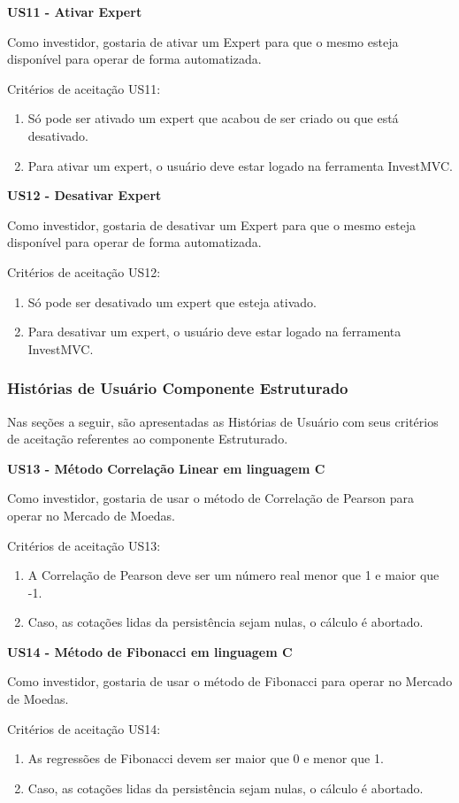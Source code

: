 \textbf{US11 - Ativar Expert}

Como investidor, gostaria de ativar um Expert para que o mesmo esteja disponível para operar de forma automatizada.

Critérios de aceitação US11:
\begin{enumerate}
\item Só pode ser ativado um expert que acabou de ser criado ou que está desativado.
\item Para ativar um expert, o usuário deve estar logado na ferramenta InvestMVC.
\end{enumerate}

\textbf{US12 - Desativar Expert}

Como investidor, gostaria de desativar um Expert para que o mesmo esteja disponível para operar de forma automatizada.

Critérios de aceitação US12:
\begin{enumerate}
\item Só pode ser desativado um expert que esteja ativado.
\item Para desativar um expert, o usuário deve estar logado na ferramenta InvestMVC.
\end{enumerate}

\subsubsection{Histórias de Usuário Componente Estruturado}
Nas seções a seguir, são apresentadas as Histórias de Usuário com seus critérios de aceitação referentes ao componente Estruturado.

\textbf{US13 - Método Correlação Linear em linguagem C}

Como investidor, gostaria de usar o método de Correlação de Pearson para operar no Mercado de Moedas.

Critérios de aceitação US13:
\begin{enumerate}
\item A Correlação de Pearson deve ser um número real menor que 1 e maior que -1.
\item Caso, as cotações lidas da persistência sejam nulas, o cálculo é abortado.
\end{enumerate}

\textbf{US14 - Método de Fibonacci em linguagem C}

Como investidor, gostaria de usar o método de Fibonacci para operar no Mercado de Moedas.

Critérios de aceitação US14:
\begin{enumerate}
\item As regressões de Fibonacci devem ser maior que 0 e menor que 1.
\item Caso, as cotações lidas da persistência sejam nulas, o cálculo é abortado.
\end{enumerate}

